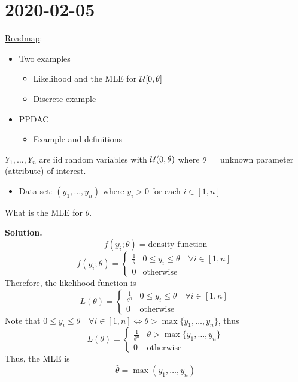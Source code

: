 \section{2020-02-05}
\underline{Roadmap}:
\begin{itemize}
    \item Two examples
          \begin{itemize}
              \item Likelihood and the MLE for $ \operatorname{\mathcal{U}}[0,\theta] $
              \item Discrete example
          \end{itemize}
    \item PPDAC
          \begin{itemize}
              \item Example and definitions
          \end{itemize}
\end{itemize}
\begin{exbox}
    \begin{example}\label{uniform mle}
        $ Y_1,\ldots ,Y_n $ are iid random variables with $ \operatorname{\mathcal{U}}(0,\theta) $
        where $ \theta= $ unknown parameter (attribute) of interest.
        \begin{itemize}
            \item Data set: $ (y_1,\ldots ,y_n) $ where $ y_i>0 $ for each $ i\in[1,n] $
        \end{itemize}
        What is the MLE for $ \theta $.
        
        \textbf{Solution.}
        \[ f(y_i;\theta)=\text{density function} \]
        \[ f(y_i;\theta)=
            \begin{cases}
                \frac{1}{\theta} & 0\leqslant y_i \leqslant \theta\quad\forall i\in[1,n] \\
                0                & \text{otherwise}
            \end{cases} \]
        Therefore, the likelihood function is
        \[ L(\theta)=
            \begin{cases}
                \frac{1}{\theta^n} & 0\leqslant y_i\leqslant \theta\quad\forall i\in[1,n] \\
                0                  & \text{otherwise}
            \end{cases} \]
        Note that $ 0\leqslant y_i\leqslant \theta\quad\forall i\in[1,n]\iff
            \theta>\max\{y_1,\ldots ,y_n\} $, thus
        \[ L(\theta)=
            \begin{cases}
                \frac{1}{\theta^n} & \theta>\max \{y_1,\ldots ,y_n\} \\
                0                  & \text{otherwise}
            \end{cases} \]
        Thus, the MLE is
        \[ \hat{\theta}=\max(y_1,\ldots ,y_n) \]
    \end{example}
\end{exbox}

